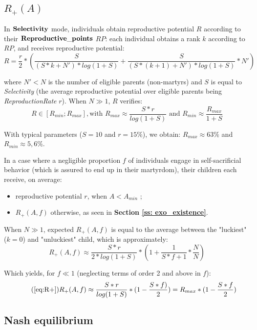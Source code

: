 \documentclass[a4paper,12pt]{report}
\begin{document}
\subsection{$R_{+}(A)$}
\label{ss:R+}
In $\bf{Selectivity}$ mode, individuals obtain reproductive potential $R$ according to their
$\bf{Reproductive\_points}$ $RP$: each individual obtains a rank $k$
according to $RP$, and receives reproductive potential:
\[ R = \frac{r}{2} * (\frac{S}
{(S*k + N')*log(1+S)} + \frac{S}{(S*(k+1) + N')*log(1+S)}*N') \]

where $N'<N$ is the number of eligible parents (non-martyrs) and $S$ is equal to \emph{Selectivity}
(the average reproductive potential over eligible parents being \emph{ReproductionRate} $r$).
When $N \gg 1$, $R$ verifies:
\begin{equation}
    R \in [R_{min};R_{max}], \textrm{with } R_{max} \approx \frac{S*r}{log(1+S)} 
    \textrm{ and } R_{min} \approx
    \frac{R_{max}}{1+S}
\label{eq:ReproPot}
\end{equation}

With typical parameters ($S=10$ and $r=15\%$), we obtain: $R_{max} \approx 63 \%$ and 
$R_{min} \approx 5,6 \%$.

In a case where a negligible proportion $f$ of individuals engage in
self-sacrificial behavior (which is assured to end up in their martyrdom), their children each
receive, on average:
\begin{itemize}
\item reproductive potential $r$, when $A < A_{min}$ ;
\item $R_{+}(A,f)$ otherwise, as seen in \textbf{Section \ref{ss: exo_existence}}.
\end{itemize}

When $N \gg 1$, expected $R_+(A,f)$ is equal to the average between the "luckiest" ($k=0$) and "unluckiest"
child, which is approximately:
\[ R_+(A,f) \approx \frac{S*r}{2*log(1+S)} * (1 + \frac{1}{S*f+1}*\frac{N}{N})\]

Which yields, for $f\ll 1$ (neglecting terms of order 2 and above in $f$):
\begin{equation}
    \tag{\ref{eq:R+}}
    R_+(A,f) \approx  \frac{S*r}{log(1+S)} * (1 - \frac{S*f)}{2}) = 
    R_{max}*(1-\frac{S*f}{2})
\end{equation}

\subsection{Nash equilibrium}
\label{ss_e_a:ESS}

 
\end{document}
